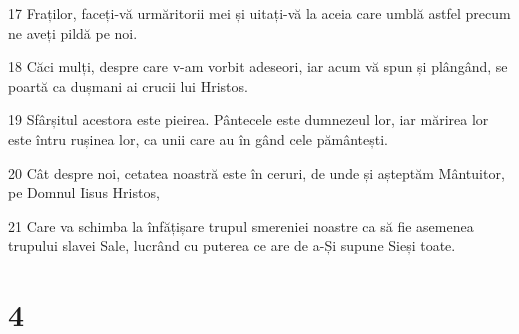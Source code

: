 \par 17 Fraților, faceți-vă urmăritorii mei și uitați-vă la aceia care umblă astfel precum ne aveți pildă pe noi.
\par 18 Căci mulți, despre care v-am vorbit adeseori, iar acum vă spun și plângând, se poartă ca dușmani ai crucii lui Hristos.
\par 19 Sfârșitul acestora este pieirea. Pântecele este dumnezeul lor, iar mărirea lor este întru rușinea lor, ca unii care au în gând cele pământești.
\par 20 Cât despre noi, cetatea noastră este în ceruri, de unde și așteptăm Mântuitor, pe Domnul Iisus Hristos,
\par 21 Care va schimba la înfățișare trupul smereniei noastre ca să fie asemenea trupului slavei Sale, lucrând cu puterea ce are de a-Și supune Sieși toate.

\chapter{4}

